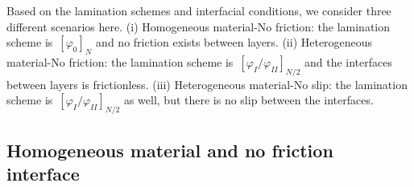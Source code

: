 \documentclass[preprint,10pt,times]{elsarticle}
\numberwithin{equation}{section}
\renewcommand{\>}{$\Rightarrow$}
\begin{document}
Based on the lamination schemes and interfacial conditions, we consider three different scenarios here. (i) Homogeneous material-No friction: the lamination scheme is~$[\varphi_0]_N$ and no friction exists between layers. (ii) Heterogeneous material-No friction: the lamination scheme is~$[\varphi_I/\varphi_{II}]_{N/2}$ and the interfaces between layers is frictionless. (iii) Heterogeneous material-No slip: the lamination scheme is~$[\varphi_I/\varphi_{II}]_{N/2}$ as well, but there is no slip between the interfaces.

\subsection{Homogeneous material and no friction interface}
\label{sec:1mat_no_friction}
\end{document}
